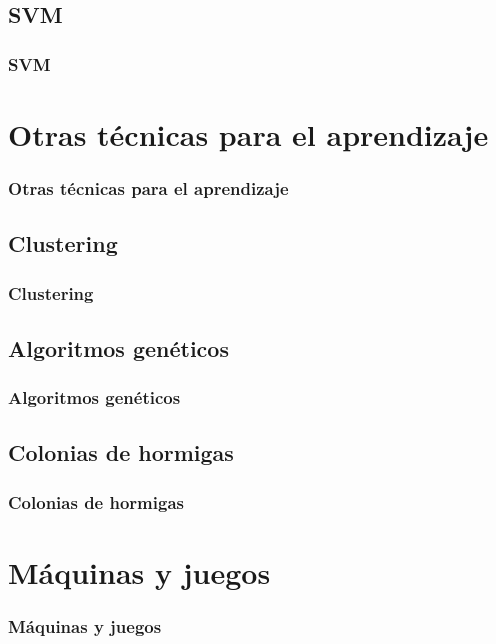 \documentclass{beamer} %
\begin{document}
	\subsection{SVM}
		\begin{frame}
		\frametitle{SVM}
		\end{frame}

\section{Otras técnicas para el aprendizaje}
	\begin{frame}
	\frametitle{Otras técnicas para el aprendizaje}
	\end{frame}

	\subsection{Clustering}
		\begin{frame}
		\frametitle{Clustering}
		\end{frame}

	\subsection{Algoritmos genéticos}
		\begin{frame}
		\frametitle{Algoritmos genéticos}
		\end{frame}

	\subsection{Colonias de hormigas}
		\begin{frame}
		\frametitle{Colonias de hormigas}
		\end{frame}

\section{Máquinas y juegos}
	\begin{frame}
	\frametitle{Máquinas y juegos}
	\end{frame}
\end{document}
